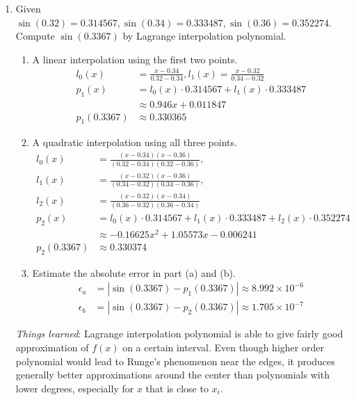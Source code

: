 \documentclass[10pt]{report}
\newcommand{\abs}[1] {\left| #1 \right|}
\begin{document}
\begin{enumerate}
	\item 
	Given $\sin(0.32)=0.314567, \sin(0.34)=0.333487, \sin(0.36)=0.352274$. Compute $\sin(0.3367)$ by Lagrange interpolation polynomial.
	\begin{enumerate}
		\item 
		A linear interpolation using the first two points.
		\begin{align*}
			l_0(x) &= \frac{x-0.34}{0.32-0.34},
			l_1(x) = \frac{x-0.32}{0.34-0.32}\\
			p_1(x) &= l_0(x)\cdot 0.314567 + l_1(x)\cdot 0.333487\\
			&\approx 0.946x + 0.011847\\
			p_1(0.3367) &\approx 0.330365
		\end{align*}
		
		\item 
		A quadratic interpolation using all three points.
		\begin{align*}
		l_0(x) &= \frac{(x-0.34)(x-0.36)}{(0.32-0.34)(0.32-0.36)},\\
		l_1(x) &= \frac{(x-0.32)(x-0.36)}{(0.34-0.32)(0.34-0.36)},\\
		l_2(x) &= \frac{(x-0.32)(x-0.34)}{(0.36-0.32)(0.36-0.34)}\\
		p_2(x) &= l_0(x)\cdot 0.314567 + l_1(x)\cdot 0.333487 + l_2(x)\cdot 0.352274\\
		&\approx -0.16625x^2 + 1.05573x - 0.006241\\
		p_2(0.3367) &\approx 0.330374
		\end{align*}
		
		\item 
		Estimate the absolute error in part (a) and (b).
		\begin{align*}
			\epsilon_a &= \abs{\sin{(0.3367)} - p_1(0.3367)} \approx 8.992\times 10^{-6}\\
			\epsilon_b &= \abs{\sin{(0.3367)} - p_2(0.3367)} \approx 1.705\times 10^{-7}
		\end{align*}
	\end{enumerate}
	\textit{Things learned}: Lagrange interpolation polynomial is able to give fairly good approximation of $f(x)$ on a certain interval. Even though higher order polynomial would lead to Runge's phenomenon near the edges, it produces generally better approximations around the center than polynomials with lower degrees, especially for $x$ that is close to $x_i$.
\end{enumerate}
\end{document}
